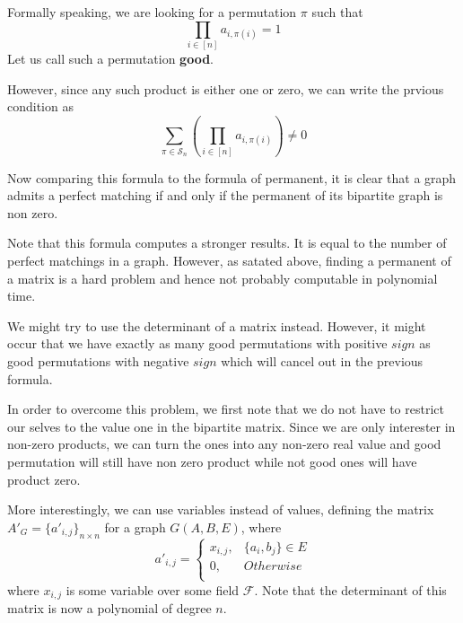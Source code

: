 Formally speaking, we are looking for a permutation $\pi$ such that
\[
	\prod\limits_{i \in [n]} a_{i, \pi(i)} = 1
\]
Let us call such a permutation \textbf{good}.

However, since any such product is either one or zero, we can write the prvious condition as
\[
	\sum\limits_{\pi \in \mathcal{S}_n}\left( \prod\limits_{i \in [n]} a_{i, \pi(i)}\right) \neq 0
\]

Now comparing this formula to the  formula of permanent, it is clear that a graph admits a perfect matching if and only if the permanent of its bipartite graph is non zero.

Note that this formula computes a stronger results. It is equal to the number of perfect matchings in a graph. However, as satated above, finding a permanent of a matrix is a hard problem and hence not probably computable in polynomial time.

We might try to use the determinant of a matrix instead. However, it might occur that we have exactly as many good permutations with positive $sign$ as good permutations with negative $sign$ which will cancel out in the previous formula.

In order to overcome this problem, we first note that we do not have to restrict our selves to the value one in the bipartite matrix. Since we are only interester in non-zero products, we can turn the ones into any non-zero real value and good permutation will still have non zero product while not good ones will have product zero.

More interestingly, we can use variables instead of values, defining the matrix $A'_G = \{a'_{i,j}\}_{n\times n}$ for a graph $G(A, B, E)$, where
	\begin{equation*}
		a'_{i,j} =
		\begin{cases}
			x_{i,j}, & \{a_i, b_j\} \in E\\
			0, & Otherwise\\
		\end{cases}
	\end{equation*}
	where $x_{i, j}$ is some variable over some field $\mathcal{F}$. Note that the determinant of this matrix is now a polynomial of degree $n$.
	
